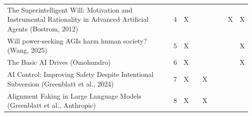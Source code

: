 \begin{landscape}
\begin{longtable}{|p{14cm}|c|c|c|c|c|c|c|c|}
		The Superintelligent Will: Motivation and Instrumental Rationality in Advanced Artificial Agents (Bostrom, 2012) & 4           & X                                  &                                                           &                                                       &                                                            &                                           & X                                            & X                                                  \\
		Will power-seeking AGIs harm human society? (Wang, 2025)                                                         & 5           & X                                  &                                                           &                                                       &                                                            &                                           &                                              & X                                                  \\
		The Basic AI Drives (Omohundro)                                                                                  & 6           & X                                  &                                                           &                                                       &                                                            &                                           &                                              & X                                                  \\
		AI Control: Improving Safety Despite Intentional Subversion (Greenblatt et al., 2024)                            & 7           & X                                  &                                                           & X                                                     &                                                            &                                           &                                              &                                                    \\
		Alignment Faking in Large Language Models (Greenblatt et al., Anthropic)                                         & 8           & X                                  &                                                           & X                                                     &                                                            &                                           &                                              &                                                    \\

\end{longtable}
\end{landscape}
